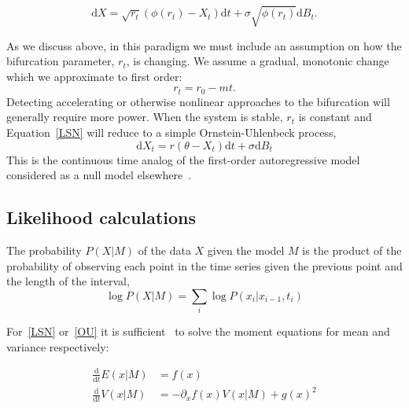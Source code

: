 \documentclass[authoryear,review,11pt]{elsarticle}
\newcommand{\ud}{\mathrm{d}}
\begin{document}
\begin{equation}
\ud X = \sqrt{ r_t } (\phi(r_t) - X_t)\ud t + \sigma\sqrt{\phi(r_t) } \ud B_t. \label{LSN}
\end{equation}



As we discuss above, in this paradigm we must include an assumption on how the bifurcation parameter, $r_t$, is changing.
We assume a gradual, monotonic change which we approximate to first order: 
\begin{equation}
r_t = r_0 - m t.
\label{R_t}
\end{equation}
Detecting accelerating or otherwise nonlinear approaches to the bifurcation will generally require more power.
When the system is stable, $r_t$ is constant and Equation~\eqref{LSN} will reduce to a simple Ornstein-Uhlenbeck process, 
\begin{equation}
\ud X_t = r (\theta - X_t) \ud t + \sigma \ud B_t \label{OU}
\end{equation}
This is the continuous time analog of the first-order autoregressive model considered as a null model elsewhere~\citep[\emph{e.g.}][]{Dakos2008, Guttal2008a}. 




\subsection*{Likelihood calculations}
The probability \(P(X|M) \) of the data \(X\) given the model \(M\) is the product of the probability of observing each point in the time series given the previous point and the length of the interval,  
\begin{equation}
\log P(X | M)=  \sum_i \log P(x_i | x_{i-1}, t_i)
\end{equation}

For~\eqref{LSN} or~\eqref{OU} it is sufficient~\citep{Gardiner2009} to solve the moment equations for mean and variance respectively:

\begin{align}
 \frac{\ud }{\ud t} E(x| M)&=  f(x) \\
\frac{\ud}{\ud t} V(x| M) &=  -\partial_x f(x) V(x|M) + g(x)^2 
  \label{general_moments}
\end{align}
\end{document}

